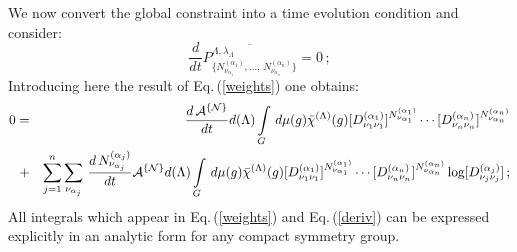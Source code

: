 \documentclass[a4paper,11pt]{article}
\begin{document}
We now convert the global constraint into a time evolution
condition and consider:
\begin{equation} \label{cond}
\frac{d}{dt}\overline{P^{\Lambda,\lambda_{\Lambda}}_{\{N^{(\alpha_1)}_{\nu_{\alpha_1}},
\dots,\,N^{(\alpha_n)}_{\nu_{\alpha_n}}\}}}=0\,;
\end{equation}
Introducing  here the result of Eq.\,(\ref{weights}) one obtains:
\begin{eqnarray} \label{deriv}
0&=&\frac{d\,{\cal A}^{\{{\cal N}\}}}{dt}
d(\Lambda)\int\limits_G\,d\mu(g)\bar\chi^{(\Lambda)}(g)
[D^{(\alpha_1)}_{\nu_1\nu_1}]^{N^{(\alpha_1)}_{\nu_{\alpha_1}}}\cdots
[D^{(\alpha_n)}_{\nu_n\nu_n}]^{N^{(\alpha_n)}_{\nu_{\alpha_n}}}
\nonumber\\ &\;+&\sum_{j=1}^n\sum_{\nu_{\alpha_j}}\,
\frac{d\,N^{(\alpha_j)}_{\nu_{\alpha_j}}}{dt} {\cal A}^{\{{\cal
N}\}}d(\Lambda) \int\limits_G\,d\mu(g)\bar\chi^{(\Lambda)}(g)
[D^{(\alpha_1)}_{\nu_1\nu_1}]^{N^{(\alpha_1)}_{\nu_{\alpha_1}}}\cdots
[D^{(\alpha_n)}_{\nu_n\nu_n}]^{N^{(\alpha_n)}_{\nu_{\alpha_n}}}
\log[D^{(\alpha_j)}_{\nu_j\nu_j}] \,;
\end{eqnarray}
All integrals which appear in Eq.\,(\ref{weights}) and
Eq.\,(\ref{deriv}) can be expressed explicitly in an analytic form
for any compact symmetry group.
\end{document}

